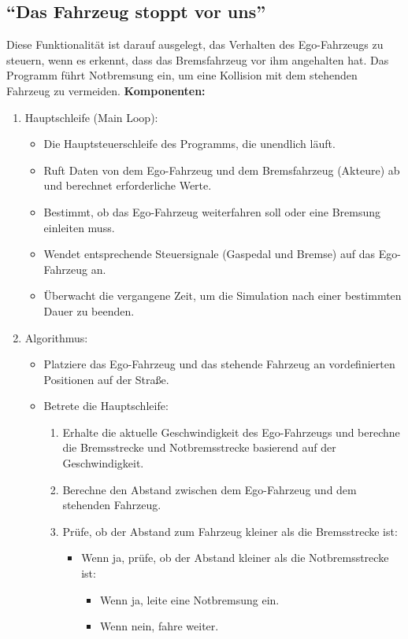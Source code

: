 \subsection{\enquote{Das Fahrzeug stoppt vor uns}}
Diese Funktionalität ist darauf ausgelegt, das Verhalten des Ego-Fahrzeugs zu steuern, wenn es erkennt, dass das Bremsfahrzeug vor ihm angehalten hat. Das Programm führt Notbremsung ein, um eine Kollision mit dem stehenden Fahrzeug zu vermeiden.\newline
\textbf{Komponenten:}
\begin{enumerate}
	\item Hauptschleife (Main Loop):
	\begin{itemize}
		\item Die Hauptsteuerschleife des Programms, die unendlich läuft.
		\item Ruft Daten von dem Ego-Fahrzeug und dem Bremsfahrzeug (Akteure) ab und berechnet erforderliche Werte.
		\item Bestimmt, ob das Ego-Fahrzeug weiterfahren soll oder eine Bremsung einleiten muss.
		\item Wendet entsprechende Steuersignale (Gaspedal und Bremse) auf das Ego-Fahrzeug an.
		\item Überwacht die vergangene Zeit, um die Simulation nach einer bestimmten Dauer zu beenden.
	\end{itemize}
	\item Algorithmus:
	\begin{itemize}
		\item Platziere das Ego-Fahrzeug und das stehende Fahrzeug an vordefinierten Positionen auf der Straße.
		\item Betrete die Hauptschleife:
		\begin{enumerate}
			\item Erhalte die aktuelle Geschwindigkeit des Ego-Fahrzeugs und berechne die Bremsstrecke und Notbremsstrecke basierend auf der Geschwindigkeit.
			\item Berechne den Abstand zwischen dem Ego-Fahrzeug und dem stehenden Fahrzeug.
			\item Prüfe, ob der Abstand zum Fahrzeug kleiner als die Bremsstrecke ist:
			\begin{itemize}
				\item Wenn ja, prüfe, ob der Abstand kleiner als die Notbremsstrecke ist:
				\begin{itemize}
					\item Wenn ja, leite eine Notbremsung ein.
					\item Wenn nein, fahre weiter.

\end{itemize}
\end{itemize}
\end{enumerate}
\end{itemize}
\end{enumerate}
